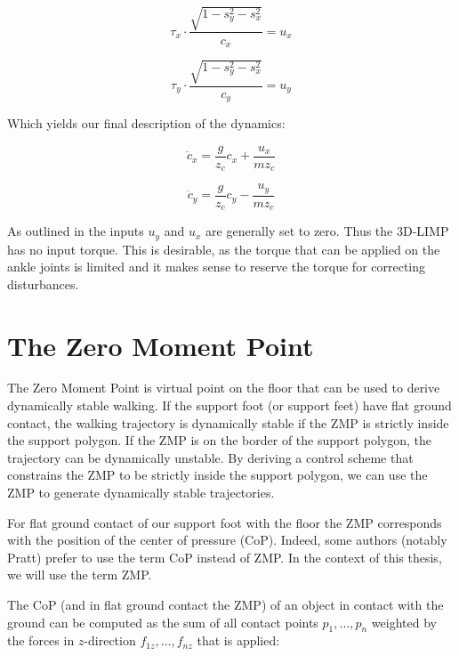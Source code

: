 \documentclass[english,ngerman]{KITreprt}
\begin{document}
\begin{equation}
\tau_x \cdot \frac{\sqrt{1 - s_y^2 - s_x^2}}{c_x} = u_x
\end{equation}

\begin{equation}
\tau_y \cdot \frac{\sqrt{1 - s_y^2 - s_x^2}}{c_y} = u_y
\end{equation}

Which yields our final description of the dynamics:

\begin{equation} \label{eq:lip-x}
\ddot{c}_x = \frac{g}{z_c} c_x + \frac{u_x}{m z_c}
\end{equation}

\begin{equation} \label{eq:lip-y}
\ddot{c}_y = \frac{g}{z_c} c_y - \frac{u_y}{m z_c}
\end{equation}

As outlined in \cite{kajita20013d} the inputs $u_y$ and $u_x$ are
generally set to zero. Thus the 3D-LIMP has no input torque. This is
desirable, as the torque that can be applied on the ankle joints is
limited and it makes sense to reserve the torque for correcting
disturbances.

\section{The Zero Moment Point}\label{the-zero-moment-point}

The Zero Moment Point is virtual point on the floor that can be used to
derive dynamically stable walking. If the support foot (or support feet)
have flat ground contact, the walking trajectory is dynamically stable
if the ZMP is strictly inside the support polygon. If the ZMP is on the
border of the support polygon, the trajectory can be dynamically
unstable. By deriving a control scheme that constrains the ZMP to be
strictly inside the support polygon, we can use the ZMP to generate
dynamically stable trajectories.

For flat ground contact of our support foot with the floor the ZMP
corresponds with the position of the center of pressure (CoP). Indeed,
some authors (notably Pratt) prefer to use the term CoP instead of ZMP.
In the context of this thesis, we will use the term ZMP.

The CoP (and in flat ground contact the ZMP) of an object in contact
with the ground can be computed as the sum of all contact points
$p_1, \dots, p_n$ weighted by the forces in $z$-direction
$f_{1z}, \dots, f_{nz}$ that is applied:
\end{document}
